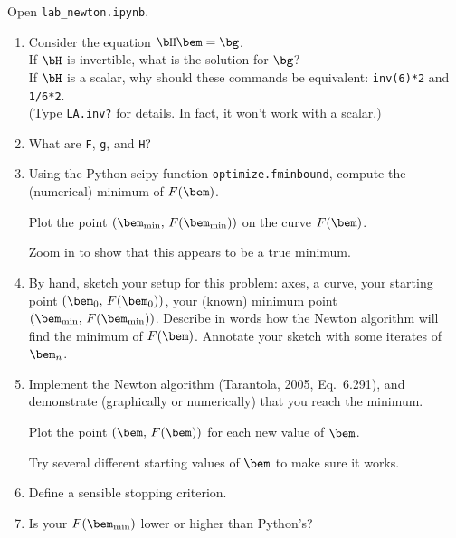 \documentclass[11pt,titlepage,fleqn]{article}
\renewcommand{\vertgap}{\vspace{1.5cm}}
\begin{document}
Open \verb+lab_newton.ipynb+.
%
\begin{enumerate}
\item Consider the equation $\bH\bem = \bg$. \\
If $\bH$ is invertible, what is the solution for $\bg$? \\
If $\bH$ is a scalar, why should these commands be equivalent: \verb+inv(6)*2+ and \verb+1/6*2+. \\
(Type \verb+LA.inv?+ for details. In fact, it won't work with a scalar.)

\vertgap

\item What are \verb+F+, \verb+g+, and \verb+H+?

\vertgap

\item Using the Python scipy function \verb+optimize.fminbound+, compute the (numerical) minimum of $F(\bem)$.

Plot the point $(\bem_{\rm min},\,F(\bem_{\rm min}))$ on the curve $F(\bem)$.

Zoom in to show that this appears to be a true minimum.

\item By hand, sketch your setup for this problem: axes, a curve, your starting point $(\bem_0,\,F(\bem_0))$, your (known) minimum point $(\bem_{\rm min},\,F(\bem_{\rm min}))$. Describe in words how the Newton algorithm will find the minimum of $F(\bem)$. Annotate your sketch with some iterates of $\bem_n$.

\vspace{10cm}

\item Implement the Newton algorithm (Tarantola, 2005, Eq.~6.291), and demonstrate (graphically or numerically) that you reach the minimum.

Plot the point $(\bem,\,F(\bem))$ for each new value of $\bem$.

Try several different starting values of $\bem$ to make sure it works.

\vertgap

\item Define a sensible stopping criterion.

\vertgap

\item Is your $F(\bem_{\rm min})$ lower or higher than Python's?


\end{enumerate}
\end{document}
